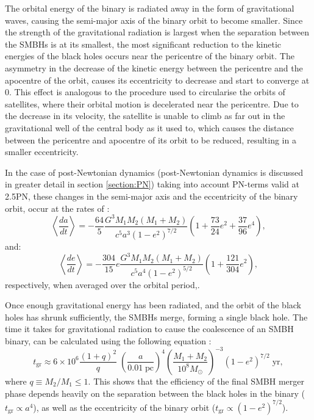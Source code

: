 \documentclass[english, twoside]{HYgradu}
\begin{document}
The orbital energy of the binary is radiated away in the form of gravitational waves, causing the semi-major axis of the binary orbit to become smaller. Since the strength of the gravitational radiation is largest when the separation between the SMBHs is at its smallest, the most significant reduction to the kinetic energies of the black holes occurs near the pericentre of the binary orbit. The asymmetry in the decrease of the kinetic energy between the pericentre and the apocentre of the orbit, causes its eccentricity to decrease and start to converge at $0$. This effect is analogous to the procedure used to circularise the orbits of satellites, where their orbital motion is decelerated near the pericentre. Due to the decrease in its velocity, the satellite is unable to climb as far out in the gravitational well of the central body as it used to, which causes the distance between the pericentre and apocentre of its orbit to be reduced, resulting in a smaller eccentricity.

In the case of post-Newtonian dynamics (post-Newtonian dynamics is discussed in greater detail in section \ref{section:PN}) taking into account PN-terms valid at 2.5PN, these changes in the semi-major axis and the eccentricity of the binary orbit, occur at the rates of \citep{Peters1964}:
\begin{equation}
\left\langle \frac{da}{dt} \right\rangle = -\frac{64}{5}\frac{G^3M_1M_2(M_1+M_2)}{c^5a^3(1-e^2)^{7/2}} \left( 1+\frac{73}{24}e^2+\frac{37}{96}e^4 \right), \label{eq:pn_dadt}
\end{equation}
and:
\begin{equation}
\left\langle \frac{de}{dt} \right\rangle = -\frac{304}{15}e\frac{G^3M_1M_2(M_1+M_2)}{c^5a^4(1-e^2)^{5/2}} \left( 1+\frac{121}{304}e^2 \right), \label{eq:pn_dedt}
\end{equation}
respectively, when averaged over the orbital period,. 

Once enough gravitational energy has been radiated, and the orbit of the black holes has shrunk sufficiently, the SMBHs merge, forming a single black hole. The time it takes for gravitational radiation to cause the coalescence of an SMBH binary, can be calculated using the following equation \citep{MerrittBook}:
\begin{equation}
t_\mathrm{gr} \approx 6 \times 10^6 \frac{(1+q)^2}{q} \; \left( \frac{a}{0.01 \; \mathrm{pc}} \right)^4 \left( \frac{M_1 + M_2}{10^8 M_\odot} \right)^{-3} (1-e^2)^{7/2} \; \mathrm{yr}, \label{eq:t_gr}
\end{equation}
where $q \equiv M_2/M_1 \leq 1$. This shows that the efficiency of the final SMBH merger phase depends heavily on the separation between the black holes in the binary ($t_\mathrm{gr} \propto a^4$), as well as the eccentricity of the binary orbit ($t_\mathrm{gr} \propto (1-e^2)^{7/2}$).
\end{document}
